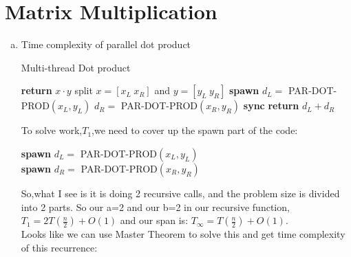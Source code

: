 \documentclass{article}
\begin{document}
\section{Matrix Multiplication}
\begin{enumerate}[(a)] %

\item Time complexity of parallel dot product

\begin{center}
\algrenewcommand\textproc{}
\begin{algorithm}
\renewcommand{\thealgorithm}{2.a):}
\caption{Multi-thread Dot product}
\begin{algorithmic}[1]

\State \textbf{return} $x\cdot y$
\EndIf
\State split $x =[x_L\ x_R]$ and $y=[y_L\  y_R]$
\State\textbf{spawn} $d_L=$ PAR-DOT-PROD$(x_L,y_L)$
\State$d_R=$ PAR-DOT-PROD$(x_R,y_R)$
\State\textbf{sync}
\State\textbf{return} $d_L + d_R$
\EndFunction
\end{algorithmic}
\end{algorithm}
\end{center}
To solve work,$T_1$,we need to cover up the spawn part of the code:
\begin{center}
   \textbf{spawn} $d_L=$ PAR-DOT-PROD$(x_L,y_L)$\\
   \textbf{spawn} $d_R=$ PAR-DOT-PROD$(x_R,y_R)$\\
\end{center}
So,what I see is it is doing 2 recursive calls, and the problem size is divided into 2 parts. So our a=2 and our b=2 in our recursive function,\ $T_1=2T(\frac{n}{2})+O(1)$ and our span is: $T_\infty=T(\frac{n}{2})+O(1)$. \\
Looks like we can use Master Theorem to solve this and get time complexity of this recurrence: 


\end{enumerate}
\end{document}
